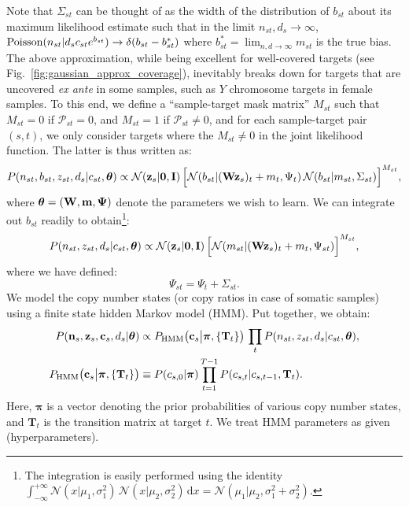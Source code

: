 \documentclass[nofootinbib,amssymb,amsmath]{revtex4}
\newcommand{\vzero}{{\bf 0}}
\newcommand{\vI}{{\bf I}}
\newcommand{\vc}{{\bf c}}
\newcommand{\vz}{{\bf z}}
\newcommand{\vn}{{\bf n}}
\newcommand{\vm}{{\bf m}}
\newcommand{\vW}{{\bf W}}
\newcommand{\vPsi}{{\bf \Psi}}
\newcommand{\vtheta}{{\boldsymbol \theta}}
\newcommand{\vpi}{{\boldsymbol \pi}}
\newcommand{\MM}{M}
\newcommand{\PP}{\mathcal{P}}
\newcommand{\norm}{{\mathcal N}}
\begin{document}
Note that $\Sigma_{st}$ can be thought of as the width of the distribution of $b_{st}$ about its maximum likelihood estimate such that in the limit $n_{st}, d_s \rightarrow \infty$, ${\rm Poisson}(n_{st} | d_s c_{st} e^{b_{st}}) \rightarrow \delta(b_{st} - b^*_{st})$ where $b^*_{st} = \lim_{n,d \rightarrow \infty} m_{st}$ is the true bias. The above approximation, while being excellent for well-covered targets (see Fig.~\ref{fig:gaussian_approx_coverage}), inevitably breaks down for targets that are uncovered {\em ex ante} in some samples, such as $Y$ chromosome targets in female samples. To this end, we define a ``sample-target mask matrix'' $\MM_{st}$ such that $\MM_{st} = 0$ if $\PP_{st} = 0$, and $\MM_{st} = 1$ if $\PP_{st} \neq 0$, and for each sample-target pair $(s,t)$, we only consider targets where the $\MM_{st} \neq 0$ in the joint likelihood function. The latter is thus written as:
\begin{equation}
P(n_{st}, b_{st}, z_{st}, d_s | c_{st}, \vtheta) \propto \norm(\vz_s | \vzero, \vI) \, \Big[\norm(b_{st} | (\vW \vz_s)_t + m_t, \Psi_t) \, \norm(b_{st} | m_{st}, \Sigma_{st})\Big]^{M_{st}},
\end{equation}
where $\vtheta = (\vW, \vm, \vPsi)$ denote the parameters we wish to learn. We can integrate out $b_{st}$ readily to obtain\footnote{The integration is easily performed using the identity $\int_{-\infty}^{+\infty} \norm(x | \mu_1, \sigma_1^2) \, \norm(x | \mu_2, \sigma_2^2) \, \mathrm{d}x = \norm(\mu_1 | \mu_2, \sigma_1^2 + \sigma_2^2)$.}:
%
\begin{equation}
P(n_{st}, z_{st}, d_s | c_{st}, \vtheta) \propto \norm(\vz_s | \vzero, \vI) \, \Big[\norm(m_{st} | (\vW \vz_s)_t + m_t, \Psi_{st})\Big]^{M_{st}},
\label{coverage_likelihood}
\end{equation}
where we have defined:
\begin{equation}
\Psi_{st} = \Psi_t + \Sigma_{st}.
\label{eq:psi_def}
\end{equation}
We model the copy number states (or copy ratios in case of somatic samples) using a finite state hidden Markov model (HMM). Put together, we obtain:
\begin{align}
P(\vn_s, \vz_s, \vc_s, d_s | \vtheta) &\propto P_\mathrm{HMM}\big(\vc_s \big|\vpi, \{\mathbf{T}_t\}\big)\, \prod_t P(n_{st}, z_{st}, d_s | c_{st}, \vtheta),\nonumber\\
P_\mathrm{HMM}\big(\vc_s \big|\vpi, \{\mathbf{T}_t\}\big) &\equiv P(c_{s,0}|\vpi) \prod_{t=1}^{T-1}P(c_{s,t}| c_{s,t-1}, \mathbf{T}_t).
\label{eq:complete_log_likelihood}
\end{align}
Here, $\vpi$ is a vector denoting the prior probabilities of various copy number states, and $\mathbf{T}_t$ is the transition matrix at target $t$. We treat HMM parameters as given (hyperparameters).\\
\end{document}
